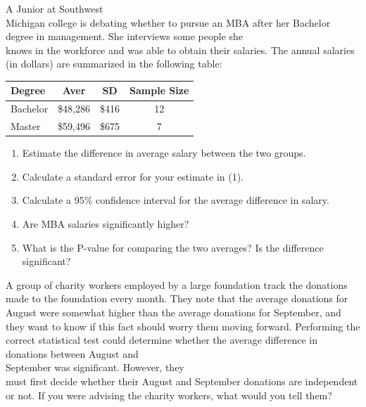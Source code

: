 \documentclass[11pt, chapterprefix=true]{scrbook}\usepackage[]{graphicx}\usepackage[]{color}
\begin{document}
\begin{exercises}
\begin{exercise}
\end{exercise}
\begin{solution}  %

\end{solution}

\begin{exercise}  %

A Junior at Southwest \\ Michigan college is debating whether to pursue an MBA after her Bachelor degree in management.  She interviews some people she \\ knows in the workforce and was able to obtain their salaries. The annual salaries (in dollars) are summarized in the following table:

\begin{tabular}{@{} lccc @{}} \hline
Degree & Aver & SD & Sample Size \\ \hline
Bachelor & \$48,286 & \$416 & 12 \\
Master   & \$59,496 & \$675 & 7 \\ \hline
\end{tabular}

\begin{enumerate}
  \item Estimate the difference in average salary between the two groups.
  \item Calculate a standard error for your estimate in (1).
  \item Calculate a 95\% confidence interval for the average difference in salary.
  \item Are MBA salaries significantly higher?
  \item What is the P-value for comparing the two averages? Is the difference significant?
\end{enumerate}
\end{exercise}  
\begin{solution}  %

\end{solution}

\begin{exercise}  %

A group of charity workers employed by a large foundation track the donations made to the foundation every month. They note that the average donations for August were somewhat higher than the average donations for September, and they want to know if this fact should worry them moving forward. Performing the correct statistical test could determine whether the average difference in donations between August and \\ September was significant. However, they \\ must first decide whether their August and  September donations are independent or not. If you were advising the charity workers, what would you tell them?
\end{exercise}
\begin{solution}  %



\end{solution}
\end{exercises}
\end{document}
